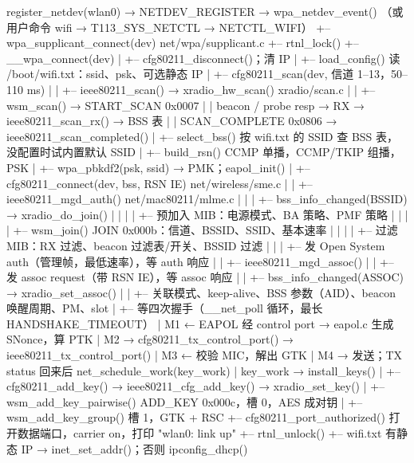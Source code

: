 \begin{txtcode}[basicstyle=\ttfamily\scriptsize]
register_netdev(wlan0) → NETDEV_REGISTER → wpa_netdev_event()
（或用户命令 wifi → T113_SYS_NETCTL → NETCTL_WIFI）
+-- wpa_supplicant_connect(dev)                                   net/wpa/supplicant.c
    +-- rtnl_lock()
    +-- __wpa_connect(dev)
    |   +-- cfg80211_disconnect()；清 IP
    |   +-- load_config()               读 /boot/wifi.txt：ssid、psk、可选静态 IP
    |   +-- cfg80211_scan(dev, 信道 1–13，50–110 ms)
    |   |   +-- ieee80211_scan() → xradio_hw_scan()             xradio/scan.c
    |   |       +-- wsm_scan() → START_SCAN 0x0007
    |   |           beacon / probe resp → RX → ieee80211_scan_rx() → BSS 表
    |   |           SCAN_COMPLETE 0x0806 → ieee80211_scan_completed()
    |   +-- select_bss()                按 wifi.txt 的 SSID 查 BSS 表，没配置时试内置默认 SSID
    |   +-- build_rsn()                 CCMP 单播，CCMP/TKIP 组播，PSK
    |   +-- wpa_pbkdf2(psk, ssid) → PMK；eapol_init()
    |   +-- cfg80211_connect(dev, {bss, RSN IE})                   net/wireless/sme.c
    |   |   +-- ieee80211_mgd_auth()                              net/mac80211/mlme.c
    |   |   |   +-- bss_info_changed(BSSID) → xradio_do_join()
    |   |   |   |   +-- 预加入 MIB：电源模式、BA 策略、PMF 策略
    |   |   |   |   +-- wsm_join()              JOIN 0x000b：信道、BSSID、SSID、基本速率
    |   |   |   |   +-- 过滤 MIB：RX 过滤、beacon 过滤表/开关、BSSID 过滤
    |   |   |   +-- 发 Open System auth（管理帧，最低速率），等 auth 响应
    |   |   +-- ieee80211_mgd_assoc()
    |   |       +-- 发 assoc request（带 RSN IE），等 assoc 响应
    |   |       +-- bss_info_changed(ASSOC) → xradio_set_assoc()
    |   |           +-- 关联模式、keep-alive、BSS 参数（AID）、beacon 唤醒周期、PM、slot
    |   +-- 等四次握手（__net_poll 循环，最长 HANDSHAKE_TIMEOUT）
    |       M1 ← EAPOL 经 control port → eapol.c 生成 SNonce，算 PTK
    |       M2 → cfg80211_tx_control_port() → ieee80211_tx_control_port()
    |       M3 ← 校验 MIC，解出 GTK
    |       M4 → 发送；TX status 回来后 net_schedule_work(key_work)
    |       key_work → install_keys()
    |           +-- cfg80211_add_key() → ieee80211_cfg_add_key() → xradio_set_key()
    |               +-- wsm_add_key_pairwise()   ADD_KEY 0x000c，槽 0，AES 成对钥
    |               +-- wsm_add_key_group()      槽 1，GTK + RSC
    +-- cfg80211_port_authorized()     打开数据端口，carrier on，打印 "wlan0: link up"
    +-- rtnl_unlock()
    +-- wifi.txt 有静态 IP → inet_set_addr()；否则 ipconfig_dhcp()
\end{txtcode}


